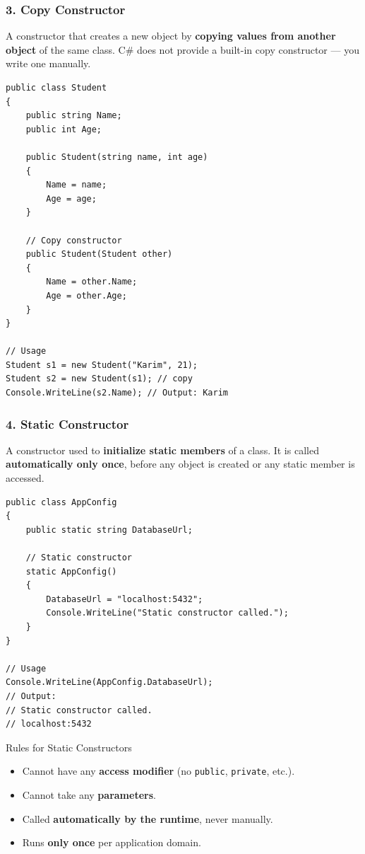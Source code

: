 \documentclass[11pt,a4paper]{article}
\begin{document}
\subsubsection{3. Copy Constructor}

A constructor that creates a new object by \textbf{copying values from another object} of the same class. C\# does not provide a built-in copy constructor — you write one manually.

\begin{lstlisting}[caption={Copy constructor}]
public class Student
{
    public string Name;
    public int Age;

    public Student(string name, int age)
    {
        Name = name;
        Age = age;
    }

    // Copy constructor
    public Student(Student other)
    {
        Name = other.Name;
        Age = other.Age;
    }
}

// Usage
Student s1 = new Student("Karim", 21);
Student s2 = new Student(s1); // copy
Console.WriteLine(s2.Name); // Output: Karim
\end{lstlisting}

\subsubsection{4. Static Constructor}

A constructor used to \textbf{initialize static members} of a class. It is called \textbf{automatically only once}, before any object is created or any static member is accessed.

\begin{lstlisting}[caption={Static constructor}]
public class AppConfig
{
    public static string DatabaseUrl;

    // Static constructor
    static AppConfig()
    {
        DatabaseUrl = "localhost:5432";
        Console.WriteLine("Static constructor called.");
    }
}

// Usage
Console.WriteLine(AppConfig.DatabaseUrl);
// Output:
// Static constructor called.
// localhost:5432
\end{lstlisting}

\begin{keyBox}{Rules for Static Constructors}
\begin{itemize}[leftmargin=*]
    \item Cannot have any \textbf{access modifier} (no \texttt{public}, \texttt{private}, etc.).
    \item Cannot take any \textbf{parameters}.
    \item Called \textbf{automatically by the runtime}, never manually.
    \item Runs \textbf{only once} per application domain.
\end{itemize}
\end{keyBox}
\end{document}
